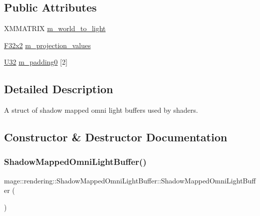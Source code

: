 \subsection*{Public Attributes}
\begin{DoxyCompactItemize}
\item 
X\+M\+M\+A\+T\+R\+IX \mbox{\hyperlink{structmage_1_1rendering_1_1_shadow_mapped_omni_light_buffer_a6ad3f982000ca1d68c3897589aa89798}{m\+\_\+world\+\_\+to\+\_\+light}}
\item 
\mbox{\hyperlink{namespacemage_a9dc0d34d6ecc87e4cfa4a826102117bc}{F32x2}} \mbox{\hyperlink{structmage_1_1rendering_1_1_shadow_mapped_omni_light_buffer_a29016735134bb44c6c6f0d52fbf9ef2c}{m\+\_\+projection\+\_\+values}}
\item 
\mbox{\hyperlink{namespacemage_a41c104c036fba3756a74e19f793eeaa1}{U32}} \mbox{\hyperlink{structmage_1_1rendering_1_1_shadow_mapped_omni_light_buffer_a01a76a39534ba04a2b1fe77ae5d1522c}{m\+\_\+padding0}} \mbox{[}2\mbox{]}
\end{DoxyCompactItemize}


\subsection{Detailed Description}
A struct of shadow mapped omni light buffers used by shaders. 

\subsection{Constructor \& Destructor Documentation}
\mbox{\label{structmage_1_1rendering_1_1_shadow_mapped_omni_light_buffer_a3b9f6ffd582185ea739410aeeec8a446}} 
\subsubsection{\texorpdfstring{Shadow\+Mapped\+Omni\+Light\+Buffer()}{ShadowMappedOmniLightBuffer()}\hspace{0.1cm}{\footnotesize\ttfamily [1/3]}}
{\footnotesize\ttfamily mage\+::rendering\+::\+Shadow\+Mapped\+Omni\+Light\+Buffer\+::\+Shadow\+Mapped\+Omni\+Light\+Buffer (\begin{DoxyParamCaption}{ }\end{DoxyParamCaption})\hspace{0.3cm}{\ttfamily [noexcept]}}

